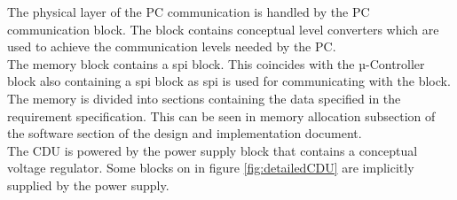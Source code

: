 The physical layer of the PC communication is handled by the PC communication block. The block contains conceptual level converters which are used to achieve the communication levels needed by the PC.\\
The memory block contains a spi block. This coincides with the µ-Controller block also containing a spi block as spi is used for communicating with the block. The memory is divided into sections containing the data specified in the requirement specification. This can be seen in memory allocation subsection of the software section of the design and implementation document.\\
The CDU is powered by the power supply block that contains a conceptual voltage regulator. Some blocks on in figure \ref{fig:detailedCDU} are implicitly supplied by the power supply.

